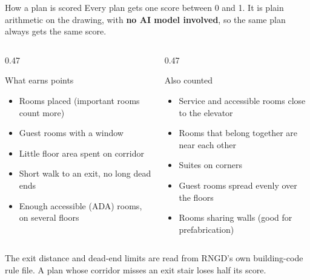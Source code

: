 \documentclass[9pt,aspectratio=169]{beamer}
\begin{document}
\begin{frame}{How a plan is scored}
Every plan gets one score between 0 and 1. It is plain arithmetic on the drawing, with \textbf{no AI model involved}, so the same plan always gets the same score.
\vspace{0.1cm}
\begin{columns}[T]
\begin{column}{0.47\textwidth}
\begin{block}{What earns points}
\begin{itemize}
\item Rooms placed (important rooms count more)
\item Guest rooms with a window
\item Little floor area spent on corridor
\item Short walk to an exit, no long dead ends
\item Enough accessible (ADA) rooms, on several floors
\end{itemize}
\end{block}
\end{column}
\begin{column}{0.47\textwidth}
\begin{block}{Also counted}
\begin{itemize}
\item Service and accessible rooms close to the elevator
\item Rooms that belong together are near each other
\item Suites on corners
\item Guest rooms spread evenly over the floors
\item Rooms sharing walls (good for prefabrication)
\end{itemize}
\end{block}
\end{column}
\end{columns}
\vspace{0.2cm}
{\small The exit distance and dead-end limits are read from RNGD's own building-code rule file. A plan whose corridor misses an exit stair loses half its score.}
\end{frame}
\end{document}
